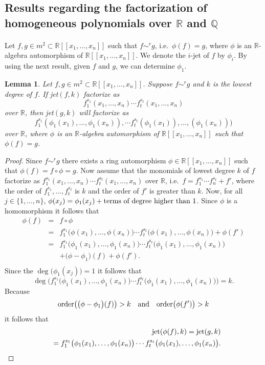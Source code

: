 \documentclass{amsproc}
\begin{document}
\subsection{Results regarding the factorization of homogeneous polynomials over $\mathbb R$ and $\mathbb Q$}
\paragraph{}Let $f,g\in m^2\subset\mathbb R[[x_1,\ldots,x_n]]$ such that $f\sim^r g$, i.e.~$\phi(f)=g$, where $\phi$ is an $\mathbb R$-algebra automorphism of  $\mathbb R[[x_1,\ldots,x_n]]$. We denote the $i$-jet of $f$ by $\phi_i$. By using the next result, given $f$ and $g$, we can determine $\phi_1$. 
\newtheorem{kjet}{Lemma}[section]
\begin{kjet}\label{kjet}
Let $f,g\in m^2\subset\mathbb R[[x_1,\ldots,x_n]]$. Suppose $f\sim^r g$ and $k$ is the lowest degree of $f$. If jet$(f,k)$ factorize as \[f_1^{s_1}(x_1,\ldots,x_n)\cdots f_t^{s_t}(x_1,\ldots,x_n)\] over $\mathbb R$, then jet$(g,k)$ will factorize as \[f_1^{s_1} (\phi_1(x_1),\ldots,\phi_1(x_n)),\cdots f_t^{s_t}(\phi_1(x_1)),\ldots,(\phi_1(x_n)))\] over $\mathbb R$, where $\phi$ is an $\mathbb R$-algebra automorphism of $\mathbb R[[x_1,\ldots,x_n]]$ such that $\phi(f)=g$. 
\end{kjet}
\begin{proof}
Since $f\sim^rg$ there exists a ring automorphism $\phi\in\mathbb R[[x_1,\ldots,x_n]]$ such that  $\phi(f)=f\circ\phi=g$. Now assume that the monomials of lowest degree $k$ of $f$ factorize as $f_1^{s_1}(x_1,\ldots,x_n)\cdots f_t^{s_t}(x_1,\ldots,x_n)$ over $\mathbb R$, i.e.~$f=f_1^{s_1}\cdots f_n^{s_t}+f'$, where the order of $f_1^{s_1},\ldots,f_t^{s_t}$ is $k$ and the order of $f'$ is greater than $k$. 
Now, for all $j\in\{1,\ldots,n\}$, $\phi(x_j)=\phi_1(x_j)+\textnormal{terms of degree higher than $1$}$. Since $\phi$ is a homomorphism it follows that
\begin{eqnarray*}\phi(f)&=&f\circ\phi\\&=&f_1^{s_1}\big(\phi(x_1),\ldots,\phi(x_n)\big)\cdots f_t^{s_t}\big(\phi(x_1),\ldots,\phi(x_n)\big)+\phi(f')\\&=&f_1^{s_1}\big(\phi_1(x_1),\ldots,\phi_1(x_n)\big)\cdots f_t^{s_t}\big(\phi_1(x_1),\ldots,\phi_1(x_n)\big)\\&&+\big(\phi-\phi_1\big)(f)+\phi(f').\\\end{eqnarray*}
Since the $\deg\big(\phi_1(x_j))=1$ it follows that \[\deg\big(f_1^{s_1}\big(\phi_1(x_1),\ldots,\phi_1(x_n)\big)\cdots f_t^{s_t}\big(\phi_1(x_1),\ldots,\phi_1(x_n)\big)\big)=k.\] Because 
\[\textnormal{order}\big(\big(\phi-\phi_1\big)(f)\big)>k\quad\textnormal{and}\quad\textnormal{order}\big(\phi(f')\big)>k\]
it follows that
\begin{eqnarray*}
&&\textnormal{jet}(\phi(f),k)=\textnormal{jet}(g,k)\\&&=f_1^{s_1}\big(\phi_1(x_1),\ldots,\phi_1(x_n)\big)\cdots f_t^{s_t}\big(\phi_1(x_1),\ldots,\phi_1(x_n)\big).
\end{eqnarray*}
\end{proof}
\end{document}
